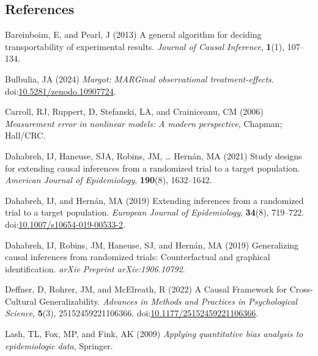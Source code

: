 \documentclass[
  single column]{article}
\newlength{\cslhangindent}
\newenvironment{CSLReferences}[2] %
 {\begin{list}{}{%
  \setlength{\itemindent}{0pt}
  \setlength{\leftmargin}{0pt}
  \setlength{\parsep}{0pt}
  \ifodd #1
   \setlength{\leftmargin}{\cslhangindent}
   \setlength{\itemindent}{-1\cslhangindent}
  \fi
  \setlength{\itemsep}{#2\baselineskip}}}
 {\end{list}}
\begin{document}
\subsection{References}\label{references}

\label{refs}
\begin{CSLReferences}{1}{0}
Bareinboim, E, and Pearl, J (2013) A general algorithm for deciding
transportability of experimental results. \emph{Journal of Causal
Inference}, \textbf{1}(1), 107--134.

Bulbulia, JA (2024) \emph{Margot: MARGinal observational
treatment-effects}.
doi:\href{https://doi.org/10.5281/zenodo.10907724}{10.5281/zenodo.10907724}.

Carroll, RJ, Ruppert, D, Stefanski, LA, and Crainiceanu, CM (2006)
\emph{Measurement error in nonlinear models: A modern perspective},
Chapman; Hall/CRC.

Dahabreh, IJ, Haneuse, SJA, Robins, JM, \ldots{} Hernán, MA (2021) Study
designs for extending causal inferences from a randomized trial to a
target population. \emph{American Journal of Epidemiology},
\textbf{190}(8), 1632--1642.

Dahabreh, IJ, and Hernán, MA (2019) Extending inferences from a
randomized trial to a target population. \emph{European Journal of
Epidemiology}, \textbf{34}(8), 719--722.
doi:\href{https://doi.org/10.1007/s10654-019-00533-2}{10.1007/s10654-019-00533-2}.

Dahabreh, IJ, Robins, JM, Haneuse, SJ, and Hernán, MA (2019)
Generalizing causal inferences from randomized trials: Counterfactual
and graphical identification. \emph{arXiv Preprint arXiv:1906.10792}.

Deffner, D, Rohrer, JM, and McElreath, R (2022) A Causal Framework for
Cross-Cultural Generalizability. \emph{Advances in Methods and Practices
in Psychological Science}, \textbf{5}(3), 25152459221106366.
doi:\href{https://doi.org/10.1177/25152459221106366}{10.1177/25152459221106366}.

Lash, TL, Fox, MP, and Fink, AK (2009) \emph{Applying quantitative bias
analysis to epidemiologic data}, Springer.


\end{CSLReferences}
\end{document}
